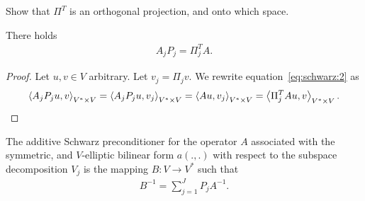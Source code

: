 \begin{todo}
  Show that $\Pi^T$ is an orthogonal projection, and onto which space.
\end{todo}

\begin{lemma}
  \label{lemma:schwarz:2}  
  There holds
  \begin{gather}
    \label{eq:schwarz:15}
    A_j P_j = \Pi^T_j A.
  \end{gather}
\end{lemma}

\begin{proof}
  Let $u,v\in V$ arbitrary. Let $v_j=\Pi_j v$. We rewrite
  equation~\eqref{eq:schwarz:2} as
  \begin{gather*}
    \scal(A_j P_j u, v)_{V^*\times V}
    = \scal(A_j P_j u, v_j)_{V^*\times V}
    = \scal(A u, v_j)_{V^*\times V}
    = \scal(\Pi^T_j A u, v)_{V^*\times V}.
  \end{gather*}
\end{proof}

\begin{definition}
  The additive Schwarz preconditioner for the operator $A$ associated
  with the symmetric, and $V$-elliptic bilinear form $a(.,.)$ with
  respect to the subspace decomposition $V_j$ is the mapping $B:
  V \to V^*$ such that
  \begin{gather}
    \label{eq:schwarz:4}
    B^{-1} = \sum_{j=1}^J P_j A^{-1}.
  \end{gather}
\end{definition}

